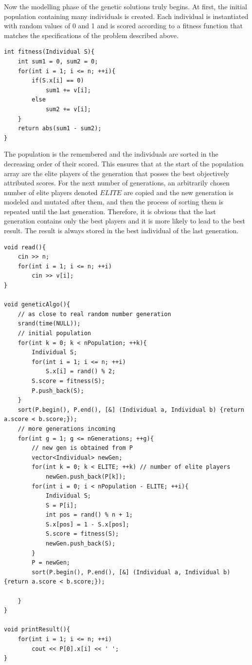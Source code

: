 \documentclass[letterpaper]{article}
\begin{document}
Now the modelling phase of the genetic solutions truly begins. At first, the initial population containing many individuals is created. Each individual is instantiated with random values of 0 and 1 and is scored according to a fitness function that matches the specifications of the problem described above.

\begin{lstlisting}
int fitness(Individual S){
    int sum1 = 0, sum2 = 0;
    for(int i = 1; i <= n; ++i){
        if(S.x[i] == 0)
            sum1 += v[i];
        else
            sum2 += v[i];
    }
    return abs(sum1 - sum2);
}
\end{lstlisting}

The population is the remembered and the individuals are sorted in the decreasing order of their scored. This ensures that at the start of the population array are the elite players of the generation that posses the best objectively attributed scores. For the next number of generations, an arbitrarily chosen number of elite players denoted $ELITE$ are copied and the new generation is modeled and mutated after them, and then the process of sorting them is repeated until the last generation. Therefore, it is obvious that the last generation contains only the best players and it is more likely to lead to the best result. The result is always stored in the best individual of the last generation.

\begin{lstlisting}
void read(){
    cin >> n;
    for(int i = 1; i <= n; ++i)
        cin >> v[i];
}

void geneticAlgo(){
    // as close to real random number generation
    srand(time(NULL)); 
    // initial population
    for(int k = 0; k < nPopulation; ++k){
        Individual S;
        for(int i = 1; i <= n; ++i)
            S.x[i] = rand() % 2;
        S.score = fitness(S);
        P.push_back(S);
    }
    sort(P.begin(), P.end(), [&] (Individual a, Individual b) {return a.score < b.score;});
    // more generations incoming
    for(int g = 1; g <= nGenerations; ++g){
        // new gen is obtained from P
        vector<Individual> newGen;
        for(int k = 0; k < ELITE; ++k) // number of elite players
            newGen.push_back(P[k]);
        for(int i = 0; i < nPopulation - ELITE; ++i){
            Individual S;
            S = P[i];
            int pos = rand() % n + 1;
            S.x[pos] = 1 - S.x[pos];
            S.score = fitness(S);
            newGen.push_back(S);
        }
        P = newGen;
        sort(P.begin(), P.end(), [&] (Individual a, Individual b) {return a.score < b.score;});

    }
}

void printResult(){
    for(int i = 1; i <= n; ++i)
        cout << P[0].x[i] << ' ';
}

\end{lstlisting}
\end{document}
